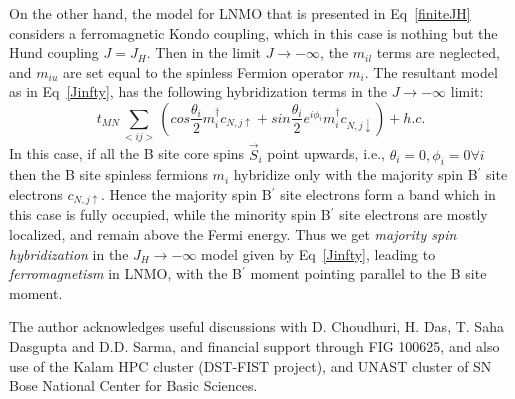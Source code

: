 \documentclass[english,aps,prb,twocolumn,showpacs]{revtex4-1}
\begin{document}
On the other hand, the model for LNMO that is presented in Eq~\ref{finiteJH}  considers a ferromagnetic Kondo
 coupling, which in this case is nothing but the Hund coupling $J=J_{H}$. 
Then in the limit $J\rightarrow -\infty$, the $m_{il}$ terms are neglected, and $m_{iu}$  are set
equal to the spinless Fermion operator $m_{i}$.
The resultant model as in Eq~\ref{Jinfty}, has the following hybridization terms in the $J\rightarrow -\infty$ limit:
\begin{equation}
t_{MN}\sum_{<ij>}(cos\frac{\theta_{i}}{2}m_{i}^{\dagger}c_{N,j\uparrow}+sin\frac{\theta_{i}}{2}e^{i\phi_{i}}m_{i}^{\dagger}c_{N,j\downarrow})+h.c. 
\end{equation}
In this case, if all the B site core spins  $\vec{S}_{i}$ point upwards, 
 i.e., $\theta_{i}=0,\phi_{i}=0 \forall i$ then the B site spinless fermions $m_{i}$ hybridize only with 
 the majority spin B$^{\prime}$ site electrons $c_{N,j\uparrow}$. Hence the majority spin B$^{\prime}$ site 
 electrons form a band which in this case is fully occupied, while the minority spin B$^{\prime}$ site electrons
 are mostly localized, and remain above the Fermi energy.
Thus we get {\em majority spin hybridization} in the $J_{H}\rightarrow -\infty$ model given by Eq~\ref{Jinfty},
 leading to {\em ferromagnetism} in LNMO, with the B$^{\prime}$ moment pointing parallel to the B site moment.\\

\begin{acknowledgments}
The author acknowledges useful discussions with D. Choudhuri, H. Das, T. Saha Dasgupta and D.D. Sarma,
 and financial support through FIG 100625, and also use of the Kalam HPC cluster (DST-FIST project),
 and UNAST cluster of SN Bose National Center for Basic Sciences. 
\end{acknowledgments}
\end{document}
